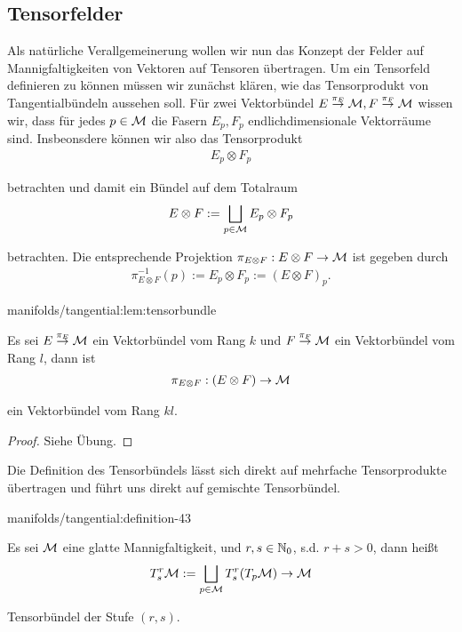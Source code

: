 \subsection{Tensorfelder}
\label{\detokenize{manifolds/tangential:tensorfelder}}
\par
Als natürliche Verallgemeinerung wollen wir nun das Konzept der Felder auf Mannigfaltigkeiten von Vektoren auf Tensoren übertragen. Um ein Tensorfeld definieren zu können müssen wir zunächst klären, wie das Tensorprodukt von Tangentialbündeln aussehen soll. Für zwei Vektorbündel \(E\overset{\pi_E}{\to}{\mathcal{M}}, F\overset{\pi_F}{\to}{\mathcal{M}}\) wissen wir, dass für jedes \(p\in\mathcal{M}\) die Fasern \(E_p, F_p\) endlichdimensionale Vektorräume sind. Insbeonsdere können wir also das Tensorprodukt
\begin{align*}
E_p\otimes F_p
\end{align*}
\par
betrachten und damit ein Bündel auf dem Totalraum
\begin{align*}
E\otimes F:= \bigsqcup_{p\in\mathcal{M}} E_p\otimes F_p
\end{align*}
\par
betrachten. Die entsprechende Projektion \(\pi_{E\otimes F}:E\otimes F\to\mathcal{M}\) ist gegeben durch
\begin{align*}
\pi_{E\otimes F}^{-1}(p):= E_p\otimes F_p := (E\otimes F)_p.
\end{align*}\begin{lemma}{}{manifolds/tangential:lem:tensorbundle}



\par
Es sei \(E\overset{\pi_E}{\to}{\mathcal{M}}\) ein Vektorbündel vom Rang \(k\) und \(F\overset{\pi_F}{\to}{\mathcal{M}}\) ein Vektorbündel vom Rang \(l\), dann ist
\begin{align*}
\pi_{E\otimes F}:(E\otimes F)\to \mathcal{M}
\end{align*}
\par
ein Vektorbündel vom Rang \(kl\).
\end{lemma}

\begin{proof}
 Siehe Übung.
\end{proof}

\par
Die Definition des Tensorbündels lässt sich direkt auf mehrfache Tensorprodukte übertragen und führt uns direkt auf gemischte Tensorbündel.
\begin{definition}{}{manifolds/tangential:definition-43}



\par
Es sei \(\mathcal{M}\) eine glatte Mannigfaltigkeit, und \(r,s\in\mathbb{N}_0\), s.d. \(r+s>0\), dann heißt
\begin{align*}
T^r_s\mathcal{M} := \bigsqcup_{p\in\mathcal{M}} T^r_s(T_p\mathcal{M}) \to \mathcal{M}
\end{align*}
\par
Tensorbündel der Stufe \((r,s)\).
\end{definition}

